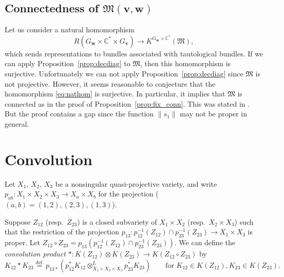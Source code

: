 \documentclass[12pt]{amsart}
\def\Bbb{\mathbb}
\def\frak{\mathfrak}
\theoremstyle{definition}
\theoremstyle{remark}
\numberwithin{equation}{subsection}
\newcommand{\propref}[1]{Proposition~\ref{#1}}
\newcommand{\defeq}{\overset{\operatorname{\scriptstyle def.}}{=}}
\newcommand{\C}{{\Bbb C}}
\newcommand{\M}{{\frak M}} %
\newcommand{\bv}{{\mathbf v}} %
\newcommand{\bw}{{\mathbf w}} %
\begin{document}
\subsection{Connectedness of $\M(\bv,\bw)$}\label{subsec:connected}

Let us consider a natural homomorphism 
\begin{equation}
\label{eq:nathom}
   R(G_\bw\times\C^*\times G_\bv) \to K^{G_\bw\times\C^*}(\M),
\end{equation}
which sends representations to bundles associated with tautological
bundles.
%
If we can apply \propref{prop:decdiag} to $\M$, then this homomorphism 
is surjective.
%
Unfortunately we can not apply \propref{prop:decdiag} since $\M$ is
not projective.
%
However, it seems reasonable to conjecture that the homomorphism
\eqref{eq:nathom} is surjective.
%
In particular, it implies that $\M$ is connected as in the proof of
\propref{prop:fix_conn}. This was stated in \cite[6.2]{Na-alg}. But the 
proof contains a gap since the function $\| s_1 \|$ may not be proper
in general.

\section{Convolution}\label{sec:convolution}


Let $X_1$, $X_2$, $X_3$ be a nonsingular quasi-projective variety, and
write $p_{ab}\colon X_1\times X_2\times X_3\to X_a\times X_b$ for the
projection ($(a,b) = (1, 2), (2,3), (1,3)$). 

Suppose $Z_{12}$ (resp.\ $Z_{23}$) is a closed subvariety of
$X_1\times X_2$ (resp.\ $X_2\times X_3$) such that the restriction of
the projection $p_{13}\colon p_{12}^{-1}(Z_{12})\cap
p_{23}^{-1}(Z_{23})\to X_1\times X_3$ is proper. Let $Z_{12}\circ
Z_{23} = p_{13}\left(p_{12}^{-1}(Z_{12})\cap
  p_{23}^{-1}(Z_{23})\right)$.  We can define the {\it convolution
product\/} \(
  \ast\colon K(Z_{12})\otimes K(Z_{23})\to K(Z_{12}\circ Z_{23})
\)
by
\begin{equation*}
  K_{12}* K_{23}
  \defeq p_{13*} \left(
  p_{12}^* K_{12}\otimes^L_{X_1\times X_2\times X_3} p_{23}^*
  K_{23}\right)
  \qquad\text{for $K_{12}\in K(Z_{12}), K_{23}\in K(Z_{23})$}.
\end{equation*}
\end{document}
